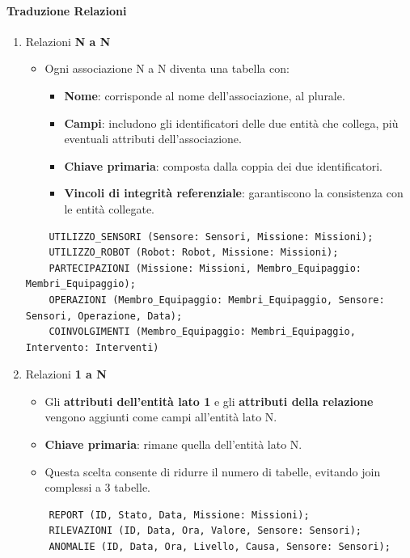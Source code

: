 \paragraph{Traduzione Relazioni}
\begin{enumerate}
    \item Relazioni \textbf{N a N}
    \begin{itemize}
        \item Ogni associazione N a N diventa una tabella con:
        \begin{itemize}
            \item \textbf{Nome}: corrisponde al nome dell’associazione, al plurale.
            \item \textbf{Campi}: includono gli identificatori delle due entità che collega, più eventuali attributi dell’associazione.
            \item \textbf{Chiave primaria}: composta dalla coppia dei due identificatori.
            \item \textbf{Vincoli di integrità referenziale}: garantiscono la consistenza con le entità collegate.
        \end{itemize}
    \end{itemize}
    \begin{lstlisting}
    UTILIZZO_SENSORI (Sensore: Sensori, Missione: Missioni);
    UTILIZZO_ROBOT (Robot: Robot, Missione: Missioni);
    PARTECIPAZIONI (Missione: Missioni, Membro_Equipaggio: Membri_Equipaggio);
    OPERAZIONI (Membro_Equipaggio: Membri_Equipaggio, Sensore: Sensori, Operazione, Data);
    COINVOLGIMENTI (Membro_Equipaggio: Membri_Equipaggio, Intervento: Interventi)
    \end{lstlisting}

    \item Relazioni \textbf{1 a N}
    \begin{itemize}
        \item Gli \textbf{attributi dell’entità lato 1} e gli \textbf{attributi della relazione} vengono aggiunti come campi all’entità lato N.
        \item \textbf{Chiave primaria}: rimane quella dell’entità lato N.
        \item Questa scelta consente di ridurre il numero di tabelle, evitando join complessi a 3 tabelle.
    \end{itemize}
    \begin{lstlisting}
    REPORT (ID, Stato, Data, Missione: Missioni);
    RILEVAZIONI (ID, Data, Ora, Valore, Sensore: Sensori);
    ANOMALIE (ID, Data, Ora, Livello, Causa, Sensore: Sensori);
    \end{lstlisting}


\end{enumerate}
